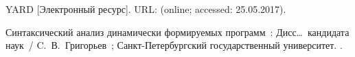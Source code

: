 \begin{thebibliography}{10}
YARD [Электронный ресурс]. \BibDash
\newblock URL:
   (online;
  accessed: 25.05.2017).

 Синтаксический анализ
  динамически формируемых программ~:
  {Дисс\ldots\ кандидата наук}~/ C.~В.~Григорьев~;
  Санкт-Петербургский государственный
  университет. \BibDash
{}.

\end{thebibliography}



